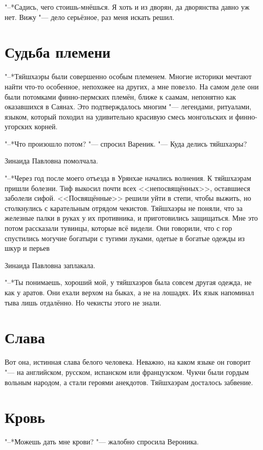 "--*Садись, чего стоишь-мнёшься.
Я хоть и из дворян, да дворянства давно уж нет.
Вижу "--- дело серьёзное, раз меня искать решил.

\section{Судьба племени}

"--*Тяйшхаэры были совершенно особым племенем.
Многие историки мечтают найти что-то особенное, непохожее на других, а мне повезло.
На самом деле они были потомками финно-пермских племён, ближе к саамам, непонятно как оказавшихся в Саянах.
Это подтверждалось многим "--- легендами, ритуалами, языком, который походил на удивительно красивую смесь монгольских и финно-угорских корней.

"--*Что произошло потом? "--- спросил Вареник.
"--- Куда делись тяйшхаэры?

Зинаида Павловна помолчала.

"--*Через год после моего отъезда в Урянхае начались волнения.
К тяйшхаэрам пришли болезни.
Тиф выкосил почти всех <<непосвящённых>>, оставшиеся заболели сифой.
<<Посвящённые>> решили уйти в степи, чтобы выжить, но столкнулись с карательным отрядом чекистов.
Тяйшхаэры не поняли, что за железные палки в руках у их противника, и приготовились защищаться.
Мне это потом рассказали тувинцы, которые всё видели.
Они говорили, что с гор спустились могучие богатыри с тугими луками, одетые в богатые одежды из шкур и перьев\ldotst

Зинаида Павловна заплакала.

"--*Ты понимаешь, хороший мой, у тяйшхаэров была совсем другая одежда, не как у аратов.
Они ехали верхом на быках, а не на лошадях.
Их язык напоминал тыва лишь отдалённо.
Но чекисты этого не знали.

\section{Слава}

Вот она, истинная слава белого человека.
Неважно, на каком языке он говорит "--- на английском, русском, испанском или французском.
Чукчи были гордым вольным народом, а стали героями анекдотов.
Тяйшхаэрам досталось забвение.

\section{Кровь}

"--*Можешь дать мне крови? "--- жалобно спросила Вероника.

